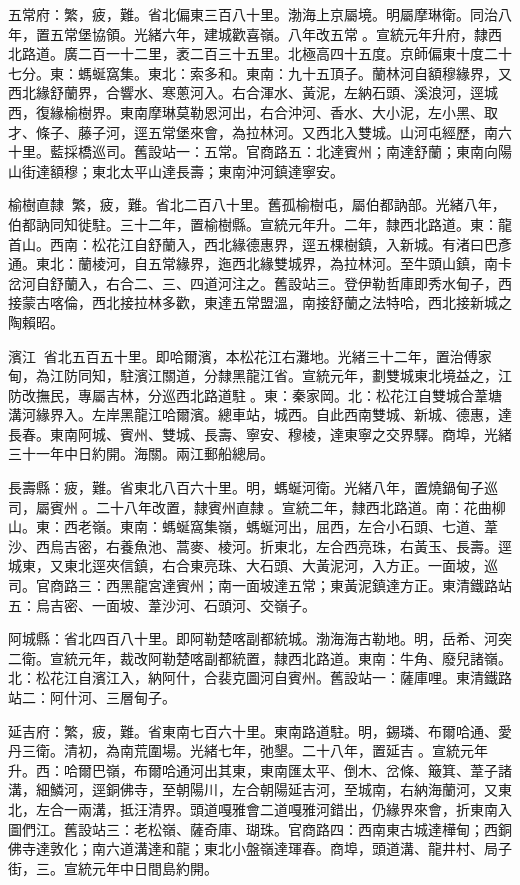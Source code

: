 \begin{pinyinscope}
五常府：繁，疲，難。省北偏東三百八十里。渤海上京屬境。明屬摩琳衛。同治八年，置五常堡協領。光緒六年，建城歡喜嶺。八年改五常。宣統元年升府，隸西北路道。廣二百一十二里，袤二百三十五里。北極高四十五度。京師偏東十度二十七分。東：螞蜒窩集。東北：索多和。東南：九十五頂子。蘭林河自額穆緣界，又西北緣舒蘭界，合響水、寒蔥河入。右合渾水、黃泥，左納石頭、溪浪河，逕城西，復緣榆樹界。東南摩琳莫勒恩河出，右合沖河、香水、大小泥，左小黑、取才、條子、藤子河，逕五常堡來會，為拉林河。又西北入雙城。山河屯經歷，南六十里。藍採橋巡司。舊設站一：五常。官商路五：北達賓州；南達舒蘭；東南向陽山街達額穆；東北太平山達長壽；東南沖河鎮達寧安。

榆樹直隸：繁，疲，難。省北二百八十里。舊孤榆樹屯，屬伯都訥部。光緒八年，伯都訥同知徙駐。三十二年，置榆樹縣。宣統元年升。二年，隸西北路道。東：龍首山。西南：松花江自舒蘭入，西北緣德惠界，逕五棵樹鎮，入新城。有渚曰巴彥通。東北：蘭棱河，自五常緣界，迤西北緣雙城界，為拉林河。至牛頭山鎮，南卡岔河自舒蘭入，右合二、三、四道河注之。舊設站三。登伊勒哲庫即秀水甸子，西接蒙古喀倫，西北接拉林多歡，東達五常盟溫，南接舒蘭之法特哈，西北接新城之陶賴昭。

濱江：省北五百五十里。即哈爾濱，本松花江右灘地。光緒三十二年，置治傅家甸，為江防同知，駐濱江關道，分隸黑龍江省。宣統元年，劃雙城東北境益之，江防改撫民，專屬吉林，分巡西北路道駐。東：秦家岡。北：松花江自雙城合葦塘溝河緣界入。左岸黑龍江哈爾濱。總車站，城西。自此西南雙城、新城、德惠，達長春。東南阿城、賓州、雙城、長壽、寧安、穆棱，達東寧之交界驛。商埠，光緒三十一年中日約開。海關。兩江郵船總局。

長壽縣：疲，難。省東北八百六十里。明，螞蜒河衛。光緒八年，置燒鍋甸子巡司，屬賓州。二十八年改置，隸賓州直隸。宣統二年，隸西北路道。南：花曲柳山。東：西老嶺。東南：螞蜒窩集嶺，螞蜒河出，屈西，左合小石頭、七道、葦沙、西烏吉密，右養魚池、蒿麥、棱河。折東北，左合西亮珠，右黃玉、長壽。逕城東，又東北逕夾信鎮，右合東亮珠、大石頭、大黃泥河，入方正。一面坡，巡司。官商路三：西黑龍宮達賓州；南一面坡達五常；東黃泥鎮達方正。東清鐵路站五：烏吉密、一面坡、葦沙河、石頭河、交嶺子。

阿城縣：省北四百八十里。即阿勒楚喀副都統城。渤海海古勒地。明，岳希、河突二衛。宣統元年，裁改阿勒楚喀副都統置，隸西北路道。東南：牛角、廢兒諸嶺。北：松花江自濱江入，納阿什，合裴克圖河自賓州。舊設站一：薩庫哩。東清鐵路站二：阿什河、三層甸子。

延吉府：繁，疲，難。省東南七百六十里。東南路道駐。明，錫璘、布爾哈通、愛丹三衛。清初，為南荒圍場。光緒七年，弛墾。二十八年，置延吉。宣統元年升。西：哈爾巴嶺，布爾哈通河出其東，東南匯太平、倒木、岔條、簸箕、葦子諸溝，細鱗河，逕銅佛寺，至朝陽川，左合朝陽延吉河，至城南，右納海蘭河，又東北，左合一兩溝，抵汪清界。頭道嘎雅會二道嘎雅河錯出，仍緣界來會，折東南入圖們江。舊設站三：老松嶺、薩奇庫、瑚珠。官商路四：西南東古城達樺甸；西銅佛寺達敦化；南六道溝達和龍；東北小盤嶺達琿春。商埠，頭道溝、龍井村、局子街，三。宣統元年中日間島約開。


\end{pinyinscope}
